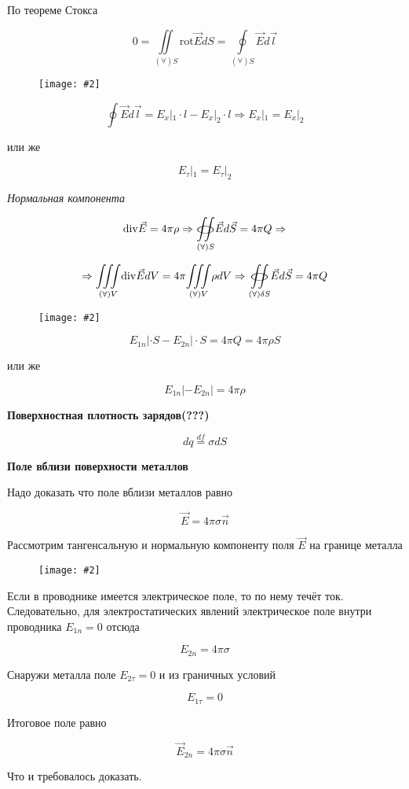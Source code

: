 \documentclass[a4paper,12pt]{article}
\newcommand{\tc}[1]{
    \vspace{0.5em}
    \noindent\textbf{\large #1}
    \vspace{0.3em}
}
\newcommand{\kr}[1]{\textit{#1}}
\newcommand{\fc}[1]{\[#1\]}
\newcommand{\mdd}[1]{$#1$}
\newcommand{\mm}[1]{\mathrm{#1}}
\newcommand{\oiint}{%
  \mathchoice%
    {\mathop{\raisebox{0.1ex}{\scalebox{1.7}[0.7]{\(\bigcirc\)}}}%
     \!\!\!\!\!\!\!\!\!\!\!\int\!\!\!\int}%
    {\mathop{\raisebox{0.2ex}{\scalebox{1.}[0.6]{\(\bigcirc\)}}}%
     \!\!\!\!\!\!\!\int\!\!\!\int}%
    {\mathop{\raisebox{0.1ex}{\scalebox{1}[0.8]{\(\bigcirc\)}}}%
     \!\!\!\!\!\!\!\!\!\int\!\!\!\int}%
    {\mathop{\raisebox{0.05ex}{\scalebox{0.8}[0.8]{\(\bigcirc\)}}}%
     \!\!\!\!\!\!\!\!\int\!\!\!\int}%
}
\newcommand{\imc}[2][0.7\textwidth]{%
    \begin{figure}[h!]
        \centering
        \texttt{[image: \#2]}
    \end{figure}%
}
\begin{document}
По теореме Стокса

\fc{0=\underset{(\forall )S}{\iint} \mm{rot}\vec{E}dS=\underset{(\forall )S}{\oint }\vec{E}d\vec{l}}

\imc[1.\textwidth]{10.png} 

\newpage


\fc{\oint \vec{E}d\vec{l}=E_x|_1\cdot l-E_x|_2\cdot l\Rightarrow E_x|_1=E_x|_2}

или же 

\fc{E_\tau|_1=E_\tau|_2}

\kr{Нормальная компонента}

\fc{\mm{div}\vec{E}=4\pi \rho \Rightarrow \underset{(\forall)S}{\oiint}\vec{E}d\vec{S}=4\pi Q \Rightarrow}

\fc{\Rightarrow \underset{(\forall)V}{\iiint} \mm{div}\vec{E}dV=4\pi \underset{(\forall)V}{\iiint} \rho dV \Rightarrow \underset{(\forall)\delta S}{\oiint}\vec{E}d\vec{S}=4\pi Q }

\imc[0.7\textwidth]{11.png}

\fc{E_{1n}|\cdot S-E_{2n}|\cdot S=4\pi Q=4\pi \rho S}

или же 

\fc{E_{1n}| -E_{2n}| =4\pi \rho }

\tc{Поверхностная плотность зарядов(???)}

\fc{dq\overset{df}{=}\sigma dS}

\newpage


\tc{Поле вблизи поверхности металлов}

Надо доказать что поле вблизи металлов равно

\fc{\vec{E}=4\pi \sigma \vec{n}}

Рассмотрим тангенсальную и нормальную компоненту поля \mdd{\vec{E}} на границе металла
 
\imc[0.7\textwidth]{12.png}

Если в проводнике имеется электрическое поле, то по нему течёт ток. Следовательно, для электростатических явлений электрическое поле внутри проводника \mdd{E_{1n}=0} отсюда 

\fc{E_{2n}=4\pi \sigma}

Снаружи металла поле \mdd{E_{2\tau }=0} и из граничных условий  

\fc{E_{1\tau}=0}

Итоговое поле равно 

\fc{\vec{E}_{2n}=4\pi \sigma \vec{n}}

Что и требовалось доказать.

\newpage
\end{document}
